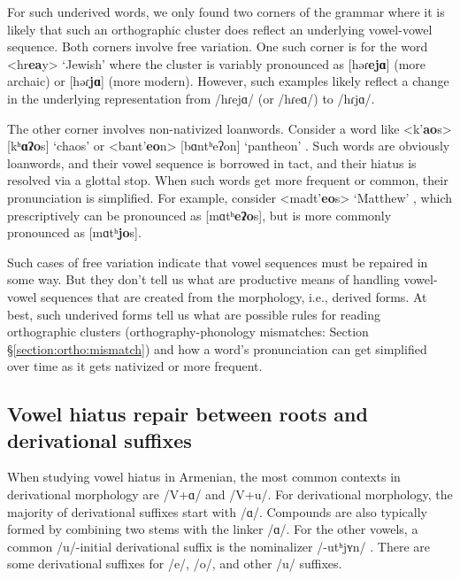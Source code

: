 {	For such underived words, we only found two corners of the grammar where it is likely that such an orthographic cluster does reflect an underlying vowel-vowel sequence. Both corners   involve free variation. One such corner is for the word <hr\textbf{ea}y> `Jewish'  where the cluster is variably pronounced as [həɾ\textbf{ejɑ}] (more archaic) or [həɾ\textbf{jɑ}] (more modern). However, such examples likely reflect a change in the underlying representation from /hɾejɑ/ (or /hɾeɑ/) to /hɾjɑ/. 
	
	The other corner involves non-nativized loanwords. Consider a word like <k'\textbf{ao}s> [kʰ\textbf{ɑʔo}s] `chaos'  or  <bant'\textbf{eo}n> [bɑntʰeʔon] `pantheon'  . Such words are obviously loanwords, and their vowel sequence is borrowed in tact, and their hiatus is resolved via a glottal stop. When such words get more frequent or common, their pronunciation is simplified. For example, consider <madt'\textbf{eo}s> `Matthew' , which prescriptively can be pronounced as [mɑtʰ\textbf{eʔo}s], but is more commonly pronounced as [mɑtʰ\textbf{jo}s]. 
	
	Such cases of free variation indicate that vowel sequences must be repaired in some way. But they don't tell us what are productive means of handling vowel-vowel sequences that are created from the morphology, i.e., derived forms. At best, such underived forms tell us what are possible rules for reading orthographic clusters (orthography-phonology mismatches: Section \S\ref{section:ortho:mismatch}) and how a word's pronunciation can get simplified   over time as it gets nativized or more frequent. 
	
	\subsection{Vowel hiatus repair between roots and derivational suffixes}\label{section:syllable:VowelHiatus:Derived}
	
	When studying vowel hiatus in Armenian, the most common contexts in derivational morphology are /V+ɑ/ and /V+u/.  For derivational morphology,  the majority of derivational suffixes start with /ɑ/. Compounds are also typically formed by combining two stems with the linker /ɑ/. For the other vowels, a common /u/-initial derivational suffix is the nominalizer /-utʰjʏn/ . There are some derivational suffixes for /e/, /o/, and other /u/ suffixes. 
	
	
	
}
